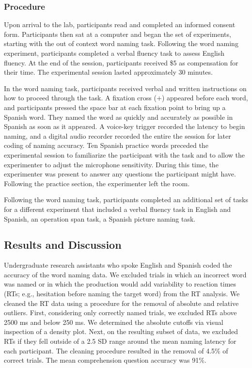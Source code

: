 \subsubsection{Procedure}
\label{procedure}

Upon arrival to the lab, participants read and completed an informed consent form. Participants then sat at a computer and began the set of experiments, starting with the out of context word naming task. Following the word naming experiment, participants completed a verbal fluency task to assess English fluency. At the end of the session, participants received \$5 as compensation for their time. The experimental session lasted approximately 30 minutes.

In the word naming task, participants received verbal and written instructions on how to proceed through the task. A fixation cross ($+$) appeared before each word, and participants pressed the space bar at each fixation point to bring up a Spanish word. They named the word as quickly and accurately as possible in Spanish as soon as it appeared. A voice-key trigger recorded the latency to begin naming, and a digital audio recorder recorded the entire the session for later coding of naming accuracy. Ten Spanish practice words preceded the experimental session to familiarize the participant with the task and to allow the experimenter to adjust the microphone sensitivity. During this time, the experimenter was present to answer any questions the participant might have. Following the practice section, the experimenter left the room. 

Following the word naming task, participants completed an additional set of tasks for a different experiment that included a verbal fluency task in English and Spanish, an operation span task, a Spanish picture naming task. 

\subsection{Results and Discussion}
\label{resultsanddiscussion}

Undergraduate research assistants who spoke English and Spanish coded the accuracy of the word naming data. We excluded trials in which an incorrect word was named or in which the production would add variability to reaction times (RTs; e.g., hesitation before naming the target word) from the RT analysis. We cleaned the RT data using a procedure for the removal of absolute and relative outliers. First, considering only correctly named trials, we excluded RTs above 2500 ms and below 250 ms. We determined the absolute cutoffs via visual inspection of a density plot. Next, on the resulting subset of data, we excluded RTs if they fell outside of a 2.5 SD range around the mean naming latency for each participant. The cleaning procedure resulted in the removal of 4.5\% of correct trials. The mean comprehension question accuracy was 91\%.


